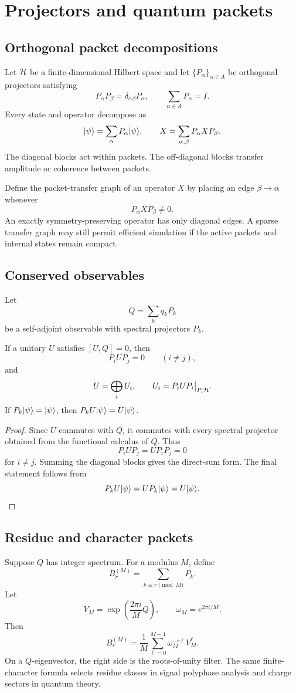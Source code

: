 \chapter{Projectors and quantum packets}
\label{ch:projectors}

\section{Orthogonal packet decompositions}
Let $\mathcal H$ be a finite-dimensional Hilbert space and let $\{P_\alpha\}_{\alpha\in A}$ be orthogonal projectors satisfying
\[
P_\alpha P_\beta=\delta_{\alpha\beta}P_\alpha,
\qquad
\sum_{\alpha\in A}P_\alpha=I.
\]
Every state and operator decompose as
\[
\lvert \psi\rangle=\sum_\alpha P_\alpha\lvert \psi\rangle,
\qquad
X=\sum_{\alpha,\beta}P_\alpha X P_\beta.
\]
The diagonal blocks act within packets. The off-diagonal blocks transfer amplitude or coherence between packets.

Define the packet-transfer graph of an operator $X$ by placing an edge $\beta\to\alpha$ whenever
\[
P_\alpha X P_\beta\neq0.
\]
An exactly symmetry-preserving operator has only diagonal edges. A sparse transfer graph may still permit efficient simulation if the active packets and internal states remain compact.

\section{Conserved observables}
Let
\[
Q=\sum_k q_kP_k
\]
be a self-adjoint observable with spectral projectors $P_k$.

\begin{theorem}
\label{thm:invariant-packets}
If a unitary $U$ satisfies $[U,Q]=0$, then
\[
P_iUP_j=0\qquad(i\neq j),
\]
and
\[
U=\bigoplus_i U_i,
\qquad
U_i=P_iUP_i\big|_{P_i\mathcal H}.
\]
If $P_k\lvert \psi\rangle=\lvert \psi\rangle$, then $P_kU\lvert \psi\rangle=U\lvert \psi\rangle$.
\end{theorem}

\begin{proof}
Since $U$ commutes with $Q$, it commutes with every spectral projector obtained from the functional calculus of $Q$. Thus
\[
P_iUP_j=UP_iP_j=0
\]
for $i\neq j$. Summing the diagonal blocks gives the direct-sum form. The final statement follows from
\[
P_kU\lvert \psi\rangle=UP_k\lvert \psi\rangle=U\lvert \psi\rangle.
\]
\end{proof}

\section{Residue and character packets}
Suppose $Q$ has integer spectrum. For a modulus $M$, define
\[
B_r^{(M)}=
\sum_{k\equiv r\pmod M}P_k.
\]
Let
\[
V_M=\exp\left(\frac{2\pi i}{M}Q\right),
\qquad
\omega_M=e^{2\pi i/M}.
\]
Then
\begin{equation}
B_r^{(M)}
=
\frac1M\sum_{\ell=0}^{M-1}
\omega_M^{-r\ell}V_M^\ell.
\label{eq:residue-projector}
\end{equation}
On a $Q$-eigenvector, the right side is the roots-of-unity filter. The same finite-character formula selects residue classes in signal polyphase analysis and charge sectors in quantum theory.

